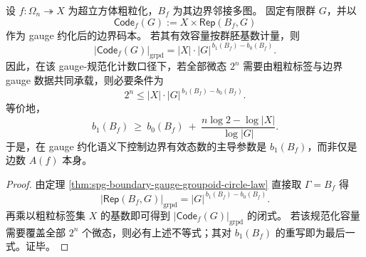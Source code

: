 \begin{corollary}\label{cor:spg-boundary-gauge-groupoid-capacity}
设 \(f:\Omega_n\twoheadrightarrow X\) 为超立方体粗粒化，\(B_f\) 为其边界邻接多图。
固定有限群 \(G\)，并以
\[
\mathsf{Code}_f(G):=X\times \mathsf{Rep}(B_f,G)
\]
作为 gauge 约化后的边界码本。
若其有效容量按群胚基数计量，则
\[
\bigl|\mathsf{Code}_f(G)\bigr|_{\mathrm{grpd}}
=
|X|\cdot |G|^{\,b_1(B_f)-b_0(B_f)}.
\]
因此，在该 gauge-规范化计数口径下，若全部微态 \(2^n\) 需要由粗粒标签与边界 gauge 数据共同承载，则必要条件为
\[
2^n\le |X|\cdot |G|^{\,b_1(B_f)-b_0(B_f)}.
\]
等价地，
\[
b_1(B_f)\ \ge\ b_0(B_f)\ +\ \frac{n\log 2-\log|X|}{\log|G|}.
\]
于是，在 gauge 约化语义下控制边界有效态数的主导参数是 \(b_1(B_f)\)，而非仅是边数 \(A(f)\) 本身。
\end{corollary}
\begin{proof}
由定理 \ref{thm:spg-boundary-gauge-groupoid-circle-law} 直接取 \(\Gamma=B_f\) 得
\[
\bigl|\mathsf{Rep}(B_f,G)\bigr|_{\mathrm{grpd}}
=
|G|^{\,b_1(B_f)-b_0(B_f)}.
\]
再乘以粗粒标签集 \(X\) 的基数即可得到 \(|\mathsf{Code}_f(G)|_{\mathrm{grpd}}\) 的闭式。
若该规范化容量需要覆盖全部 \(2^n\) 个微态，则必有上述不等式；其对 \(b_1(B_f)\) 的重写即为最后一式。证毕。
\end{proof}

\endinput
